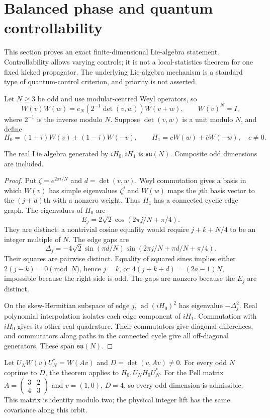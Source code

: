 \section{Balanced phase and quantum controllability}
\label{sec:balanced-control}
This section proves an exact finite-dimensional Lie-algebra statement.
Controllability allows varying controls; it is not a local-statistics theorem
for one fixed kicked propagator. The underlying Lie-algebra mechanism is a
standard type of quantum-control criterion, and priority is not asserted.

Let $N\ge3$ be odd and use modular-centred Weyl operators, so
\[
 W(v)W(w)=e_N(2^{-1}\det(v,w))W(v+w),\qquad W(v)^N=I,
\]
where $2^{-1}$ is the inverse modulo $N$. Suppose $\det(v,w)$ is a unit
modulo $N$, and define
\[
 H_0=(1+i)W(v)+(1-i)W(-v),\qquad
 H_1=cW(w)+\overline cW(-w),\quad c\ne0.
\]

\begin{theorem}\label{thm:balanced-su}
The real Lie algebra generated by $iH_0,iH_1$ is
$\mathfrak{su}(N)$. Composite odd dimensions are included.
\end{theorem}
\begin{proof}
Put $\zeta=e^{2\pi i/N}$ and $d=\det(v,w)$. Weyl commutation gives a basis
in which $W(v)$ has simple eigenvalues $\zeta^j$ and $W(w)$ maps the $j$th
basis vector to the $(j+d)$th with a nonzero weight. Thus $H_1$ has a
connected cyclic edge graph. The eigenvalues of $H_0$ are
\[
 E_j=2\sqrt2\cos(2\pi j/N+\pi/4).
\]
They are distinct: a nontrivial cosine equality would require
$j+k+N/4$ to be an integer multiple of $N$. The edge gaps are
\[
 \Delta_j=-4\sqrt2\sin(\pi d/N)
               \sin(2\pi j/N+\pi d/N+\pi/4).
\]
Their squares are pairwise distinct. Equality of squared sines implies
either $2(j-k)=0\pmod N$, hence $j=k$, or
$4(j+k+d)=(2a-1)N$, impossible because the right side is odd.
The gaps are nonzero because the $E_j$ are distinct.

On the skew-Hermitian subspace of edge $j$, $\operatorname{ad}(iH_0)^2$
has eigenvalue $-\Delta_j^2$. Real polynomial interpolation isolates each
edge component of $iH_1$. Commutation with $iH_0$ gives its other real
quadrature. Their commutators give diagonal differences, and commutators
along paths in the connected cycle give all off-diagonal generators.
These span $\mathfrak{su}(N)$.
\end{proof}

Let $U_NW(v)U_N^*=W(Av)$ and $D=\det(v,Av)\ne0$. For every odd $N$
coprime to $D$, the theorem applies to $H_0,U_NH_0U_N^*$.
For the Pell matrix $A=\left(\begin{smallmatrix}3&2\\4&3\end{smallmatrix}\right)$
and $v=(1,0)$, $D=4$, so every odd dimension is admissible. This matrix is
identity modulo two; the physical integer lift has the same covariance
along this orbit.

